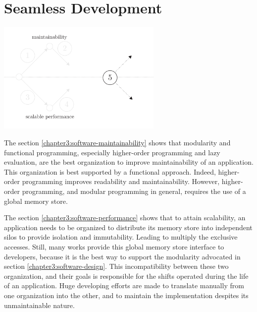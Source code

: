 \section{Seamless Development} \label{chapter3:objectives}


\begin{center}
\includegraphics[width=0.6\textwidth]{../ressources/state-of-the-art-5.pdf}
\end{center}


The section \ref{chapter3:software-maintainability} shows that modularity and functional programming, especially higher-order programming and lazy evaluation, are the best organization to improve maintainability of an application.
This organization is best supported by a functional approach.
Indeed, higher-order programming improves readability and maintainability.
However, higher-order programming, and modular programming in general, requires the use of a global memory store.

The section \ref{chapter3:software-performance} shows that to attain scalability, an application needs to be organized to distribute its memory store into independent silos to provide isolation and immutability. Leading to multiply the exclusive accesses.
Still, many works provide this global memory store interface to developers, because it is the best way to support the modularity advocated in section \ref{chapter3:software-design}.
This incompatibility between these two organization, and their goals is responsible for the shifts operated during the life of an application.
Huge developing efforts are made to translate manually from one organization into the other, and to maintain the implementation despites its unmaintainable nature.

